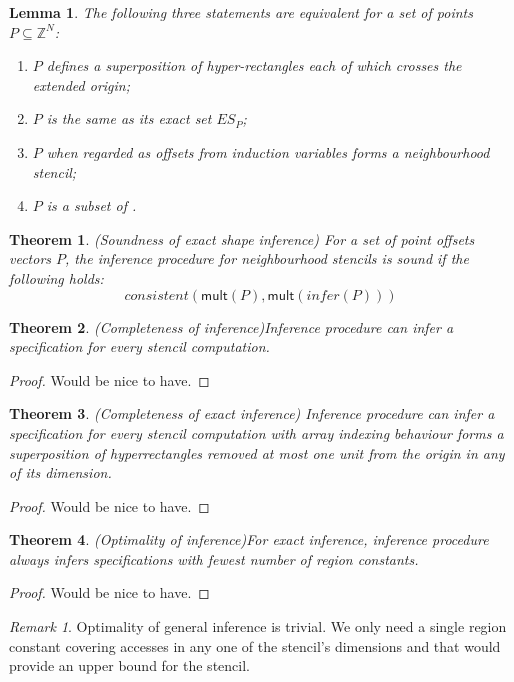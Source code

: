 \documentclass[acmlarge,review]{acmart}
\theoremstyle{definition}
\theoremstyle{plain}
\newtheorem{thm}{Theorem}
\newtheorem{lem}{Lemma}
\theoremstyle{remark}
\newtheorem{remark}{Remark}
\begin{document}
\begin{lem}
  The following three statements are equivalent for a set of points $P \subseteq
  \mathbb{Z}^N$:
%
  \begin{enumerate}
    \item $P$ defines a superposition of hyper-rectangles each of which crosses
      the extended origin;
    \item $P$ is the same as its exact set $\mathit{ES}_P$;
    \item $P$ when regarded as offsets from induction variables forms a
      neighbourhood stencil;
    \item $P$ is a subset of .
  \end{enumerate}
\end{lem}

\begin{thm}{(Soundness of exact shape inference)}
  For a set of point offsets vectors $P$, the inference procedure for
  neighbourhood stencils is sound if the following holds:
%
  \begin{equation*}
    \mathit{consistent}(\mathsf{mult}(P),\mathsf{mult}(\mathit{infer}(P)))
  \end{equation*}
\end{thm}

\begin{thm}{(Completeness of inference)}\label{thm:inf-completeness}
  Inference procedure can infer a specification for every stencil computation.
\end{thm}
%
\begin{proof}
  Would be nice to have.
\end{proof}

\begin{thm}{(Completeness of exact inference)}
  Inference procedure can infer a specification for every stencil computation
  with array indexing behaviour forms a superposition of hyperrectangles removed
  at most one unit from the origin in any of its dimension.
\end{thm}
%
\begin{proof}
  Would be nice to have.
\end{proof}

\begin{thm}{(Optimality of inference)}\label{thm:inf-optimality}
  For exact inference, inference procedure always infers specifications with
  fewest number of region constants.
\end{thm}
%
\begin{proof}
  Would be nice to have.
\end{proof}

\begin{remark}{}
  Optimality of general inference is trivial. We only need a single region
  constant covering accesses in any one of the stencil's dimensions and that
  would provide an upper bound for the stencil.
\end{remark}
\end{document}
